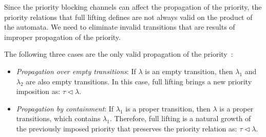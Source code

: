 Since the priority blocking channels can affect the propagation of the priority, the priority relations that full lifting defines are not always valid on the product of the automata. We need to eliminate invalid transitions that are results of improper propagation of the priority.%



The following three cases are the only valid propagation of the priority~\cite{priority}:
\begin{itemize}
 \item \emph{Propagation over empty transitions}: If $\lambda$ is an empty transition, then $\lambda_{1}$ and $\lambda_{2}$ are also empty transitions. In this case, full lifting brings a new priority imposition as: $\tau \triangleleft \lambda$.
 \item \emph{Propagation by containment}: If $\lambda_{1}$ is a proper transition, then $\lambda$ is a proper transitions, which contains $\lambda_{1}$. Therefore, full lifting is a natural growth of the previously imposed priority that preserves the priority relation as: $\tau \triangleleft \lambda$. 
 \end{itemize}

 \FloatBarrier

